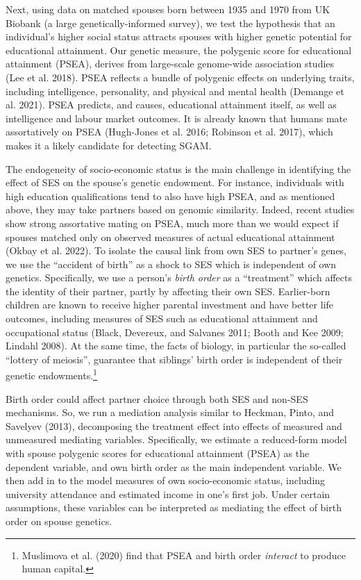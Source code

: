 \documentclass[
]{article}
\theoremstyle{definition}
\theoremstyle{definition}
\theoremstyle{definition}
\theoremstyle{definition}
\theoremstyle{remark}
\begin{document}
Next, using data on matched spouses born between 1935 and 1970 from UK Biobank
(a large genetically-informed survey), we test the hypothesis that an
individual's higher social status attracts spouses with higher genetic potential
for educational attainment. Our genetic measure, the polygenic score for
educational attainment (PSEA), derives from large-scale genome-wide association
studies (Lee et al. 2018). PSEA reflects a bundle of polygenic effects on
underlying traits, including intelligence, personality, and physical and mental
health (Demange et al. 2021). PSEA predicts, and causes, educational
attainment itself, as well as intelligence and labour market outcomes. It is
already known that humans mate assortatively on PSEA (Hugh-Jones et al. 2016; Robinson et al. 2017), which makes it a likely candidate for detecting SGAM.

The endogeneity of socio-economic status is the main challenge in identifying
the effect of SES on the spouse's genetic endowment. For instance,
individuals with high education qualifications tend to also have high PSEA, and
as mentioned above, they may take partners based on genomic similarity. Indeed,
recent studies show strong assortative mating on PSEA, much more than we would
expect if spouses matched only on observed measures of actual educational
attainment (Okbay et al. 2022). To isolate the causal link from own SES to
partner's genes, we use the ``accident of birth'' as a shock to SES which is
independent of own genetics. Specifically, we use a person's \emph{birth order} as
a ``treatment'' which affects the identity of their partner, partly by affecting
their own SES. Earlier-born children are known to receive higher parental
investment and have better life outcomes, including measures of SES such as
educational attainment and occupational status (Black, Devereux, and Salvanes 2011; Booth and Kee 2009; Lindahl 2008). At the same time, the facts of biology, in
particular the so-called ``lottery of meiosis'', guarantee that siblings' birth
order is independent of their genetic endowments.\footnote{Muslimova et al. (2020) find that PSEA and birth order
  \emph{interact} to produce human capital.}

Birth order could affect partner choice through both SES and non-SES mechanisms.
So, we run a mediation analysis similar to Heckman, Pinto, and Savelyev (2013),
decomposing the treatment effect into effects of measured and unmeasured
mediating variables. Specifically, we estimate a reduced-form model with spouse
polygenic scores for educational attainment (PSEA) as the dependent variable,
and own birth order as the main independent variable. We then add in to the
model measures of own socio-economic status, including university
attendance and estimated income in one's first job. Under certain assumptions,
these variables can be interpreted as mediating the effect of birth order on
spouse genetics.
\end{document}
